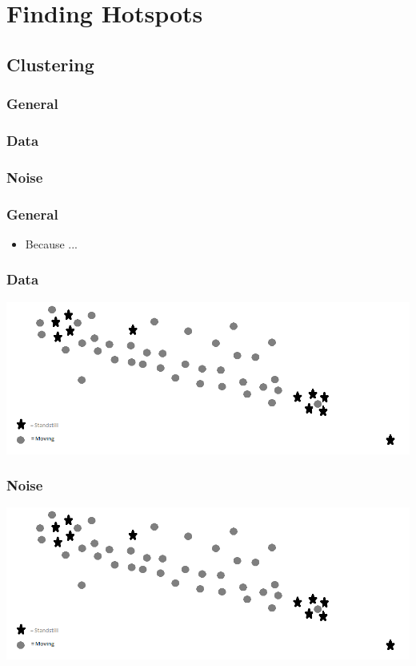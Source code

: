 \section{Finding Hotspots}

\subsection{Clustering}
\subsubsection{General}
\subsubsection{Data}
\subsubsection{Noise}
\begin{frame}
\frametitle{General}
	\begin{itemize}
		\item Because ...
	\end{itemize}
\end{frame}	
\begin{frame}
\frametitle{Data}
	\begin{center}
		\includegraphics[scale=0.5]{graphics/pointtype-example}
	\end{center}
\end{frame}	
\begin{frame}
\frametitle{Noise}
	\begin{center}
		\includegraphics[scale=0.5]{graphics/pointtype-example}
	\end{center}
\end{frame}	

